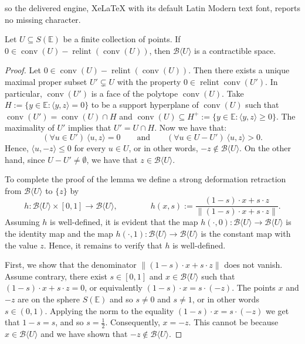 \documentclass[10pt,a4paper]{amsart}
\DeclareMathOperator{\conv}{\mathrm{conv}}
\DeclareMathOperator{\relint}{\mathrm{relint}}
\newcommand\E{\mathbb{E}}
\begin{document}
so the delivered engine, XeLaTeX with its default Latin Modern text font, reports no missing character.
\begin{lemma}
	\label{lem :  case 02}
	Let $U\subseteq S(\E)$ be a finite collection of points.
	If $0\in \conv (U) - \relint(\conv (U))$, then $\mathscr{B}\langle U\rangle$ is a contractible space.
\end{lemma}

\begin{proof}
	Let $0\in \conv (U) - \relint(\conv (U))$.
	Then there exists a unique maximal proper subset $U'\subsetneq  U$ with the property $0\in \relint\conv (U')$.
	In particular, $\conv (U')$ is a face of the polytope $\conv (U)$.
	Take $H:=\{y\in \E : \langle y,z\rangle=0\}$ to be a support hyperplane of $\conv (U)$ such that $\conv (U')=\conv (U)\cap H$ and $\conv (U)\subseteq H^+:=\{y\in \E : \langle y,z\rangle\geq 0\}$.
	The maximality of $U'$ implies that $U'=U\cap H$.
	Now we have that:
	\[
		(\forall u\in U')\ \langle u,z\rangle =0
		\qquad\text{and}\qquad
		(\forall u\in U-U')\ \langle u,z\rangle >0.
	\]
	Hence, $\langle u,-z\rangle \leq 0$ for every $u\in U$, or in other words, $-z\notin \mathscr{B}\langle U\rangle$.
	On the other hand, since $U-U'\neq\emptyset$, we have that $z\in \mathscr{B}\langle U\rangle$.

	\medskip
	To complete the proof of the lemma we define a strong deformation retraction from $\mathscr{B}\langle U\rangle$ to $\{z\}$ by
	\[
		h\colon \mathscr{B}\langle U\rangle\times [0,1]\longrightarrow \mathscr{B}\langle U\rangle,
		\qquad\qquad
		h(x,s):=\frac{(1-s)\cdot x+s\cdot z}{\| (1-s)\cdot x+s\cdot z\|}.
	\]
	Assuming $h$ is well-defined, it is evident that the map $h(\cdot,0)\colon \mathscr{B}\langle U\rangle\longrightarrow \mathscr{B}\langle U\rangle$ is the identity map and the map $h(\cdot,1)\colon \mathscr{B}\langle U\rangle\longrightarrow \mathscr{B}\langle U\rangle$ is the constant map with the value $z$.
	Hence, it remains to verify that $h$ is well-defined.

	\medskip
	First, we show that the denominator $\|(1-s)\cdot x+s\cdot z\|$ does not vanish.
	Assume contrary, there exist $s\in [0,1]$ and $x\in  \mathscr{B}\langle U\rangle$ such that $(1-s)\cdot x+s\cdot z=0$, or equivalently $(1-s)\cdot x= s\cdot (-z)$.
	The points $x$ and $-z$ are on the sphere $S(\E)$ and so $s\neq 0$ and $s\neq 1$, or in other words $s\in (0,1)$.
	Applying the norm to the equality $(1-s)\cdot x= s\cdot (-z)$ we get that $1-s=s$, and so $s=\frac12$.
	Consequently, $x=-z$.
	This cannot be because $x\in \mathscr{B}\langle U\rangle$ and we have shown that $-z\notin \mathscr{B}\langle U\rangle$.


\end{proof}
\end{document}
